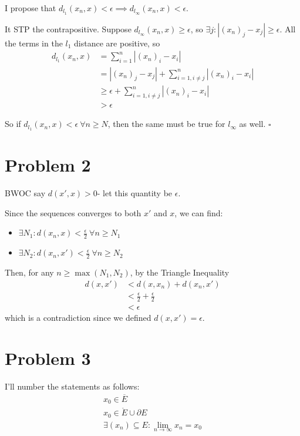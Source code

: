 \documentclass[12pt]{article}
\begin{document}
I propose that $d_{l_1}(x_n, x) < \epsilon \implies d_{l_\infty}(x_n, x) < \epsilon$.

It STP the contrapositive.
Suppose $d_{l_\infty}(x_n, x) \ge \epsilon$, so $\exists j: |(x_n)_j - x_j| \ge \epsilon$.
All the terms in the $l_1$ distance are positive, so
\begin{align*}
    d_{l_1}(x_n, x)
    &= \sum_{i=1}^{n} |(x_n)_i-x_i| \\
    &= |(x_n)_j-x_j| + \sum_{i=1, i \ne j}^{n} |(x_n)_i-x_i| \\
    &\ge \epsilon + \sum_{i=1, i \ne j}^{n} |(x_n)_i-x_i| \\
    &> \epsilon
\end{align*}

So if $d_{l_1}(x_n, x) < \epsilon\ \forall n \ge N$, then the same must be true for $l_\infty$ as well. $\square$

\section{Problem 2}

BWOC say $d(x', x) > 0$- let this quantity be $\epsilon$.

Since the sequences converges to both $x'$ and $x$, we can find:
\begin{itemize}[nolistsep]
    \item $\exists N_1: d(x_n, x) < \frac{\epsilon}{2}\ \forall n \ge N_1$
    \item $\exists N_2: d(x_n, x') < \frac{\epsilon}{2}\ \forall n \ge N_2$
\end{itemize}
Then, for any $n \ge \max(N_1, N_2)$, by the Triangle Inequality
\begin{align*}
    d(x, x')
    &< d(x, x_n)+d(x_n, x') \\
    &< \frac{\epsilon}{2}+\frac{\epsilon}{2} \\
    &< \epsilon
\end{align*}
which is a contradiction since we defined $d(x, x')=\epsilon$.

\section{Problem 3}\label{sec:int_bound_union}

I'll number the statements as follows:
\begin{gather}
    x_0 \in \overline{E} \\
    x_0 \in \mathring{E} \cup \partial E \\
    \exists (x_n) \subseteq E: \lim_{n \to \infty} x_n = x_0
\end{gather}
\end{document}
